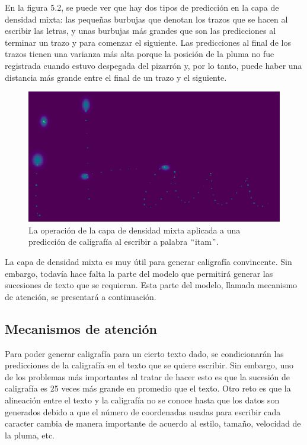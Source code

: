 \vspace{1em}

En la figura 5.2, se puede ver que hay dos tipos de predicción en la capa de densidad mixta: las pequeñas burbujas que denotan los trazos que se hacen al escribir las letras, y unas burbujas más grandes que son las predicciones al terminar un trazo y para comenzar el siguiente. Las predicciones al final de los trazos tienen una varianza más alta porque la posición de la pluma no fue registrada cuando estuvo despegada del pizarrón y, por lo tanto, puede haber una distancia más grande entre el final de un trazo y el siguiente.
\cite{DBLP:journals/corr/Graves13}

\begin{figure}[h]
\begin{center}
\includegraphics[width=150mm, scale = 0.8]{./imag/mdn.png}
\end{center}
\caption{La operación de la capa de densidad mixta aplicada a una predicción de caligrafía al escribir a palabra $``$itam$"$.}
\end{figure}

\vspace{1em}

La capa de densidad mixta es muy útil para generar caligrafía convincente. Sin embargo, todavía hace falta la parte del modelo que permitirá generar las sucesiones de texto que se requieran. Esta parte del modelo, llamada mecanismo de atención, se presentará a continuación.

\subsection{Mecanismos de atención}
Para poder generar caligrafía para un cierto texto dado, se condicionarán las predicciones de la caligrafía en el texto que se quiere escribir. Sin embargo, uno de los problemas más importantes al tratar de hacer esto es que la sucesión de caligrafía es 25 veces más grande en promedio que el texto. Otro reto es que la alineación entre el texto y la caligrafía no se conoce hasta que los datos son generados debido a que el número de coordenadas usadas para escribir cada caracter cambia de manera importante de acuerdo al estilo, tamaño, velocidad de la pluma, etc. 
\cite{DBLP:journals/corr/Graves13}

